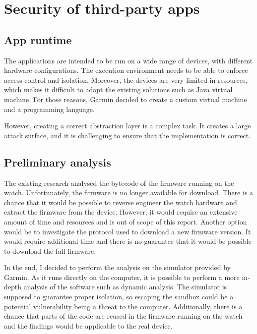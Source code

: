 
\chapter{Security of third-party apps}

\section{App runtime}

The applications are intended to be run on a wide range of devices, with different hardware configurations.
The execution environment needs to be able to enforce access control and isolation.
Moreover, the devices are very limited in resources, which makes it difficult to adapt the existing solutions such as Java virtual machine.
For those reasons, Garmin decided to create a custom virtual machine and a programming language.

However, creating a correct abstraction layer is a complex task.
It creates a large attack surface, and it is challenging to ensure that the implementation is correct.

\section{Preliminary analysis}
The existing research analysed the bytecode of the firmware running on the watch.
Unfortunately, the firmware is no longer available for download.
There is a chance that it would be possible to reverse engineer the watch hardware and extract the firmware from the device.
However, it would require an extensive amount of time and resources and is out of scope of this report.
Another option would be to investigate the protocol used to download a new firmware version.
It would require additional time and there is no guarantee that it would be possible to download the full firmware.

In the end, I decided to perform the analysis on the simulator provided by Garmin.
As it runs directly on the computer, it is possible to perform a more in-depth analysis of the software such as dynamic analysis.
The simulator is supposed to guarantee proper isolation, so escaping the sandbox could be a potential vulnerability being a threat to the computer.
Additionally, there is a chance that parts of the code are reused in the firmware running on the watch and the findings would be applicable to the real device.

